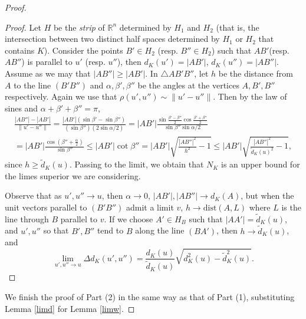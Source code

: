 \documentclass[10pt,a4paper]{amsart}
\begin{document}
\begin{proof}
\begin{proof}
Let $H$ be the \emph{strip} of $\mathbb R^n$ determined by $H_1$
and $H_2$ (that is, the intersection between two distinct half
spaces determined by $H_1$ or $H_2$ that contains $K$). Consider
the points $B' \in H_2$ (resp. $B''\in H_2$) such that $AB'$(resp.
$AB''$) is parallel to $u'$ (resp. $u''$), then $d_K(u')=|AB'|$,
$d_K(u'')=|AB''|$. Assume as we may that $|AB''|\ge |AB'|$. In
$\triangle AB'B''$, let $h$ be the distance from $A$ to the line
$(B'B'')$ and  $\alpha, \beta', \beta''$ be the angles at the
vertices $A, B', B''$ respectively. Again we use that
$\rho(u',u'') \sim \|u'-u''\|$. Then by the law of sines and
$\alpha+ \beta'+ \beta''=\pi$,
\begin{multline*}
\frac{|AB''|- |AB'|}{\|u'-u''\|} = \frac{|AB'|(\sin \beta' - \sin \beta'')}
{ (\sin \beta'')( 2 \sin \alpha/2) } = |AB'| \frac{\sin \frac{\beta'-\beta''}
2  \cos \frac{\beta'+\beta''}2}{ \sin \beta''  \sin \alpha/2 }
\\
= |AB'| \frac{\cos (\beta''+  \frac{\alpha}2)}{ \sin \beta'' } \le |AB'| \cot \beta'' =
|AB'| \sqrt{\frac{|AB''|^2}{h^2} -1 } \le  |AB'| \sqrt{\frac{|AB''|^2}{\tilde d_K(u)^2} -1 },
\end{multline*}
since $h\ge \tilde d_K(u)$. Passing to the limit, we obtain that $N_K$
is an upper bound for the limes superior we are considering.

Observe that as $u', u''\to u$, then $\alpha \to 0$, $|AB'|,|AB''|\to d_K(A)$,
but when the unit vectors parallel to $(B'B'')$ admit a limit $v$,
$h\to \mbox{dist}(A, L)$
where $L$ is the line through $B$ parallel to $v$.
If we choose $A' \in H_B$ such that $|AA'|= \tilde d_K(u)$, and $u',u''$
so that $B', B''$ tend to $B$ along the line $(BA')$, then
$h\to  \tilde d_K(u)$, and $$\lim_{u',u''\to u}\Delta d_K(u',u'')=
\frac{d_K(u)}{\tilde d_K(u)}\sqrt{d^2_K(u)-\tilde d^2_K(u)}.$$
\end{proof}

We finish the proof of Part (2) in the same way as that of Part
(1), substituting Lemma \ref{limd} for Lemma \ref{limw}.
\end{proof}
\end{document}
